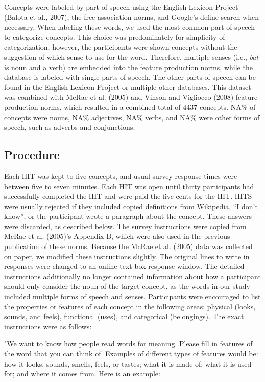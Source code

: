 \documentclass[english,,man]{apa6}
\theoremstyle{definition}
\theoremstyle{definition}
\theoremstyle{definition}
\theoremstyle{remark}
\begin{document}
Concepts were labeled by part of speech using the English Lexicon
Project (Balota et al., 2007), the free association norms, and Google's
define search when necessary. When labeling these words, we used the
most common part of speech to categorize concepts. This choice was
predominately for simplicity of categorization, however, the
participants were shown concepts without the suggestion of which sense
to use for the word. Therefore, multiple senses (i.e., \emph{bat} is
noun and a verb) are embedded into the feature production norms, while
the database is labeled with single parts of speech. The other parts of
speech can be found in the English Lexicon Project or multiple other
databases. This dataset was combined with McRae et al. (2005) and Vinson
and Vigliocco (2008) feature production norms, which resulted in a
combined total of 4437 concepts. NA\% of concepts were nouns, NA\%
adjectives, NA\% verbs, and NA\% were other forms of speech, such as
adverbs and conjunctions.

\hypertarget{procedure}{%
\subsection{Procedure}\label{procedure}}

Each HIT was kept to five concepts, and usual survey response times were
between five to seven minutes. Each HIT was open until thirty
participants had successfully completed the HIT and were paid the five
cents for the HIT. HITS were usually rejected if they included copied
definitions from Wikipedia, \enquote{I don't know}, or the participant
wrote a paragraph about the concept. These answers were discarded, as
described below. The survey instructions were copied from McRae et al.
(2005)'s Appendix B, which were also used in the previous publication of
these norms. Because the McRae et al. (2005) data was collected on
paper, we modified these instructions slightly. The original lines to
write in responses were changed to an online text box response window.
The detailed instructions additionally no longer contained information
about how a participant should only consider the noun of the target
concept, as the words in our study included multiple forms of speech and
senses. Participants were encouraged to list the properties or features
of each concept in the following areas: physical (looks, sounds, and
feels), functional (uses), and categorical (belongings). The exact
instructions were as follows:

"We want to know how people read words for meaning. Please fill in
features of the word that you can think of. Examples of different types
of features would be: how it looks, sounds, smells, feels, or tastes;
what it is made of; what it is used for; and where it comes from. Here
is an example:
\end{document}
